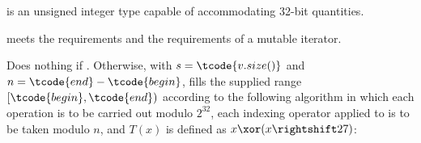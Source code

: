 \begin{itemdescr}
\pnum
\mandates
  is an unsigned integer type capable of accommodating 32-bit quantities.

\pnum
\expects
   meets the
   requirements
  and the requirements of a mutable iterator.

\pnum
\effects
 Does nothing if .
 Otherwise,
 with $s = \tcode{v.size()}$
 and  $n = \tcode{end} - \tcode{begin}$,
 fills the supplied range $[\tcode{begin},\tcode{end})$
 according to the following algorithm
 in which
 each operation is to be carried out modulo $2^{32}$,
 each indexing operator applied to  is to be taken modulo $n$,
 and $T(x)$ is defined as $x \xor (x \rightshift 27)$:


\end{itemdescr}
